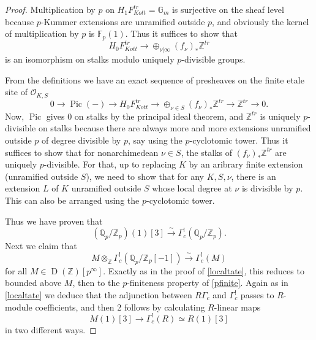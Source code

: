 \documentclass[12pt]{article}
\theoremstyle{definition}
\newcommand{\on}{\operatorname}
\newcommand{\mc}{\mathcal}
\newcommand{\mbb}{\mathbb}
\begin{document}
\begin{proof}
Multiplication by $p$ on $H_1F^{tr}_{Kott}=\mbb{G}_m$ is surjective on the sheaf level because $p$-Kummer extensions are unramified outside $p$, and obviously the kernel of multiplication by $p$ is $\mbb{F}_p(1)$.  Thus it suffices to show that 
$$H_0F^{tr}_{Kott}\to\oplus_{\nu|\infty}(f_\nu)_\ast\mbb{Z}^{tr}$$
is an isomorphism on stalks modulo uniquely $p$-divisible groups.

From the definitions we have an exact sequence of presheaves on the finite etale site of $\mc{O}_{K,S}$
$$0\to\on{Pic}(-)\to H_0F^{tr}_{Kott}\to \oplus_{\nu\in S}(f_\nu)_\ast\mbb{Z}^{tr}\to \mbb{Z}^{tr} \to 0.$$
Now, $\on{Pic}$ gives $0$ on stalks by the principal ideal theorem, and $\mbb{Z}^{tr}$ is uniquely $p$-divisible on stalks because there are always more and more extensions unramified outside $p$ of degree divisible by $p$, say using the $p$-cyclotomic tower.  Thus it suffices to show that for nonarchimedean $\nu\in S$, the stalks of $(f_\nu)_\ast\mbb{Z}^{tr}$ are uniquely $p$-divisible.  For that, up to replacing $K$ by an aribrary finite extension (unramified outside $S$), we need to show that for any $K,S,\nu$, there is an extension $L$ of $K$ unramified outside $S$ whose local degree at $\nu$ is divisible by $p$.  This can also be arranged using the $p$-cyclotomic tower.

Thus we have proven that
$$(\mbb{Q}_p/\mbb{Z}_p)(1)[3] \overset{\sim}{\rightarrow} \Gamma_c^!(\mbb{Q}_p/\mbb{Z}_p).$$
Next we claim that
$$M\otimes_{\mbb{Z}} \Gamma_c^!(\mbb{Q}_p/\mbb{Z}_p[-1])\overset{\sim}{\rightarrow}\Gamma_c^!(M)$$
for all $M\in\on{D}(\mbb{Z})[p^\infty]$.  Exactly as in the proof of \ref{localtate}, this reduces to bounded above $M$, then to the $p$-finiteness property of \ref{pfinite}.  Again as in \ref{localtate} we deduce that the adjunction between $R\Gamma_c$ and $\Gamma_c^!$ passes to $R$-module coefficients, and then 2 follows by calculating $R$-linear maps
$$M(1)[3] \to \Gamma_c^!(R)\simeq R(1)[3]$$
in two different ways.
\end{proof}
\end{document}
